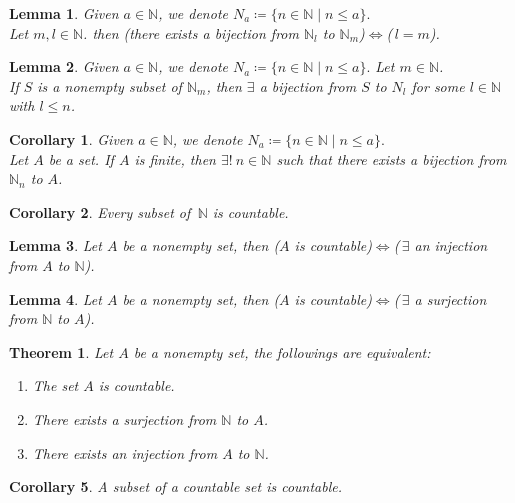\documentclass[11pt]{article}
\theoremstyle{break}
\theoremstyle{break}
\newtheorem{thm}{Theorem}[section]
\newtheorem{lem}{Lemma}[thm]
\newtheorem{corL}{Corollary}[lem]
\newtheorem{corT}[lem]{Corollary}
\newcommand{\N}{\mathbb{N}}
\begin{document}
	\begin{lem}
		Given $a \in \N$, we denote $N_a \coloneqq \{ n \in \N \mid n \leq a\}.$ \\Let $m,l \in \N$. then (there exists a bijection from $\N_l$ to $\N_m$)$\iff$(\,$l=m$).
	\end{lem}
	
	\begin{lem}
		Given $a \in \N$, we denote $N_a \coloneqq \{ n \in \N \mid n \leq a\}.$ Let $m \in \N$.\\ If $S$ is a nonempty subset of $\N_m$, then $\exists$ a bijection from $S$ to $N_l$ for some $l \in \N$ with $l \leq n$.
	\end{lem}
	
	\begin{corL}
		Given $a \in \N$, we denote $N_a \coloneqq \{ n \in \N \mid n \leq a\}.$\\
		Let $A$ be a set. If $A$ is finite, then $\exists! \ n \in \N$ such that there exists a bijection from $\N_n$ to $A$.
	\end{corL}
	
	\begin{corL}
		Every subset of \,$\N$ is countable.
	\end{corL}
	
	\begin{lem}
		Let $A$ be a nonempty set, then ($A$ is countable)$\iff$(\,$\exists$ an injection from $A$ to $\N$).
	\end{lem} 
	
	\begin{lem}
		Let $A$ be a nonempty set, then ($A$ is countable)$\iff$(\,$\exists$ a surjection from $\N$ to $A$).
	\end{lem}

	\begin{thm}
		Let $A$ be a nonempty set, the followings are equivalent:
		\begin{enumerate}[topsep=3pt,itemsep=-1ex,partopsep=1ex,parsep=1ex]
			\item The set $A$ is countable.
			\item There exists a surjection from $\N$ to $A$.
			\item There exists an injection from $A$ to $\N$.
		\end{enumerate}
	\end{thm}
	
	\begin{corT}
		A subset of a countable set is countable.
	\end{corT}	
	
\end{document}
